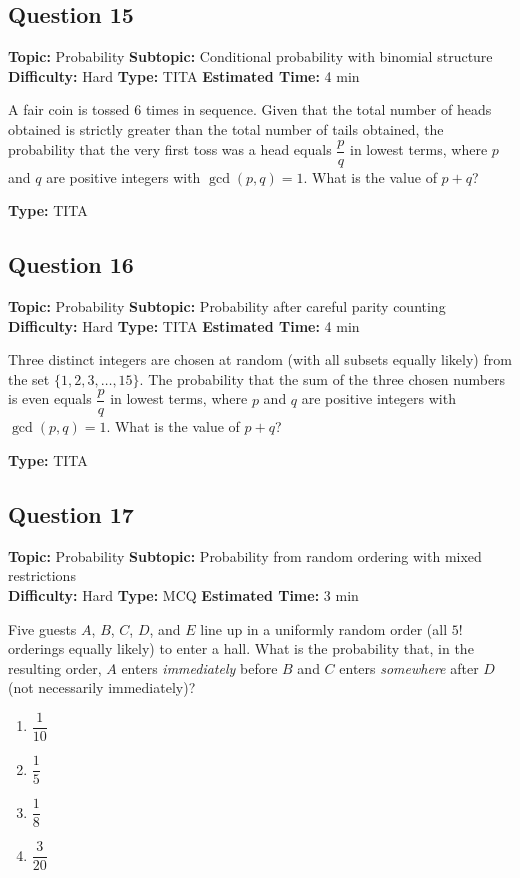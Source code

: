 \documentclass[11pt,a4paper]{article}
\begin{document}
\subsection*{Question 15}
\textbf{Topic:} Probability \quad
\textbf{Subtopic:} Conditional probability with binomial structure \\
\textbf{Difficulty:} Hard \quad
\textbf{Type:} TITA \quad
\textbf{Estimated Time:} 4 min
\begin{tcolorbox}[qbox]
A fair coin is tossed 6 times in sequence. Given that the total number of heads obtained is strictly greater than the total number of tails obtained, the probability that the very first toss was a head equals \(\dfrac{p}{q}\) in lowest terms, where \(p\) and \(q\) are positive integers with \(\gcd(p,q)=1\). What is the value of \(p + q\)?
\end{tcolorbox}
\textbf{Type:} TITA

\subsection*{Question 16}
\textbf{Topic:} Probability \quad
\textbf{Subtopic:} Probability after careful parity counting \\
\textbf{Difficulty:} Hard \quad
\textbf{Type:} TITA \quad
\textbf{Estimated Time:} 4 min
\begin{tcolorbox}[qbox]
Three distinct integers are chosen at random (with all subsets equally likely) from the set \(\{1, 2, 3, \ldots, 15\}\). The probability that the sum of the three chosen numbers is even equals \(\dfrac{p}{q}\) in lowest terms, where \(p\) and \(q\) are positive integers with \(\gcd(p,q)=1\). What is the value of \(p + q\)?
\end{tcolorbox}
\textbf{Type:} TITA

\subsection*{Question 17}
\textbf{Topic:} Probability \quad
\textbf{Subtopic:} Probability from random ordering with mixed restrictions \\
\textbf{Difficulty:} Hard \quad
\textbf{Type:} MCQ \quad
\textbf{Estimated Time:} 3 min
\begin{tcolorbox}[qbox]
Five guests \(A\), \(B\), \(C\), \(D\), and \(E\) line up in a uniformly random order (all \(5!\) orderings equally likely) to enter a hall. What is the probability that, in the resulting order, \(A\) enters \emph{immediately} before \(B\) and \(C\) enters \emph{somewhere} after \(D\) (not necessarily immediately)?
\end{tcolorbox}
\begin{enumerate}[label=(\Alph*)]
\item \(\dfrac{1}{10}\)
\item \(\dfrac{1}{5}\)
\item \(\dfrac{1}{8}\)
\item \(\dfrac{3}{20}\)
\end{enumerate}
\end{document}

